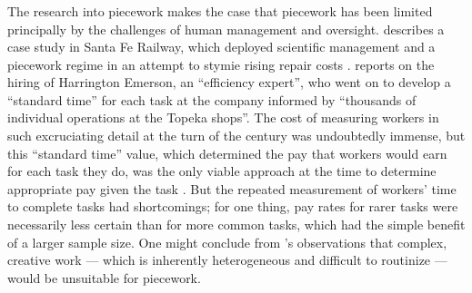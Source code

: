 \documentclass[trackingWork]{subfiles}
\begin{document}
\subsubsection{\pieceworkpers}
The research into piecework makes the case that
piecework has been limited principally by the challenges of human management and oversight.
\citeauthor{10.2307/23702539} describes a case study in Santa Fe Railway, which
deployed scientific management and a piecework regime in an attempt to stymie rising repair costs
\cite{10.2307/23702539}.
\citeauthor{10.2307/23702539} reports on the hiring of Harrington Emerson,
an ``efficiency expert'', who went on to develop a ``standard time'' for each task at the company
informed by ``thousands of individual operations at the Topeka shops''.
The cost of measuring workers in such excruciating detail at the turn of the  century was undoubtedly immense,
but this ``standard time'' value, which determined the pay that workers would earn for each task they do,
was the only viable approach at the time to determine appropriate pay given the task
\cite{10.2307/23702539}.
But the repeated measurement of workers' time to complete tasks had shortcomings;
for one thing, pay rates for rarer tasks
were necessarily less certain than for more common tasks,
which had the simple benefit of a larger sample size.
One might conclude from \citeauthor{10.2307/23702539}'s observations that
complex, creative work --- which is inherently heterogeneous and difficult to routinize ---
would be unsuitable for piecework.

\end{document}
